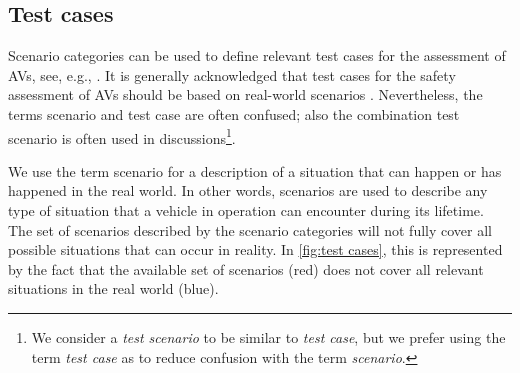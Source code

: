 \subsection{Test cases}
\label{sec:test cases}

Scenario categories can be used to define relevant test cases for the assessment of AVs, see, e.g., \cite{ploeg2018cetran,elrofai2016scenario}. It is generally acknowledged that test cases for the safety assessment of AVs should be based on real-world scenarios \cite{putz2017pegasus, roesener2016scenariobased, deGelder2017assessment}. Nevertheless, the terms scenario and test case are often confused; also the combination test scenario is often used in discussions\footnote{We consider a \emph{test scenario} to be similar to \emph{test case}, but we prefer using the term \emph{test case} as to reduce confusion with the term \emph{scenario}.}. %

We use the term scenario for a description of a situation that can happen or has happened in the real world. In other words, scenarios are used to describe any type of situation that a vehicle in operation can encounter during its lifetime. The set of scenarios described by the scenario categories will not fully cover all possible situations that can occur in reality. In \cref{fig:test cases}, this is represented by the fact that the available set of scenarios (red) does not cover all relevant situations in the real world (blue).

